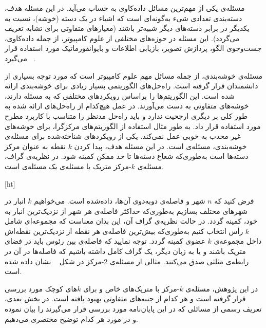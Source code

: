 

مسئله‌ی  یکی از مهم‌ترین مسائل داده‌کاوی به حساب می‌آید.
در این مسئله هدف، دسته‌بندی تعدادی شیء به‌گونه‌ای است که اشیاء در یک دسته (خوشه)، نسبت به یکدیگر در برابر دسته‌های دیگر شبیه‌تر باشند (معیارهای متفاوتی برای تشابه تعریف می‌گردد).
این مسئله در حوزه‌های مختلفی از علوم کامپیوتر، از جمله داده‌کاوی، جست‌وجوی الگو، پردازش تصویر، بازیابی اطلاعات و بایوانفورماتیک مورد استفاده قرار می‌گیرد ~.

مسئله‌ی خوشه‌بندی، از‌ جمله مسائل مهم علوم کامپیوتر است که مورد توجه بسیاری از دانشمندان قرار گرفته است.
راه‌حل‌های الگوریتمی بسیار زیادی برای خوشه‌بندی ارائه شده است.
این الگوریتم‌ها را براساس رویکرد‌های مختلفی که به مسئله دارند، خوشه‌های متفاوتی به دست می‌آورند.
در عمل هیچ‌کدام از راه‌حل‌های ارائه شده به طور کلی بر دیگری ارجحیت ندارد و باید راه‌حل مدنظر را متناسب با کاربرد مطرح مورد استفاده قرار داد.
به طور مثال استفاده از الگوریتم‌های مرکزگرا، برای خوشه‌های غیر محدب به خوبی عمل نمی‌کند.
یکی از رویکردهای شناخته‌شده برای مسئله‌ی خوشه‌بندی، مسئله‌ی  است.
در این مسئله هدف، پیدا کردن $k$ نقطه به عنوان مرکز دسته‌ها است به‌طوری‌که شعاع دسته‌ها تا حد ممکن کمینه شود.
در نظریه‌ی گراف، مسئله‌ی $k$-مرکز متریک یا مسئله‌ی  یک مسئله‌ی  است.

[ht]

فرض کنید که $n$ شهر و فاصله‌ی دوبه‌دوی آن‌ها، داده‌شده است.
می‌خواهیم $k$ انبار در شهرهای مختلف بسازیم به‌طوری‌که حداکثر فاصله‌ی هر شهر از نزدیک‌ترین انبار به خود، کمینه گردد.
در حالت نظریه‌ی گراف آن، این بدان معناست که مجموعه‌ای شامل $k$ رأس انتخاب کنیم به‌طوری‌که بیش‌ترین فاصله‌ی هر نقطه از نزدیک‌ترین نقطه‌اش داخل مجموعه‌ی $k$ عضوی کمینه گردد.
توجه نمایید که فاصله‌ی بین رئوس باید در فضای متریک باشند و یا به زبان دیگر، یک گراف کامل داشته باشیم که فاصله‌ها در آن در رابطه‌ی مثلثی صدق می‌کنند.
مثالی از مسئله‌ی $2$-مرکز در شکل ~ نشان داده شده است.

در این پژوهش، مسئله‌ی $k$-مرکز با متریک‌های خاص و برای $k$های کوچک مورد بررسی قرار گرفته است و هر کدام از‌ جنبه‌های متفاوتی بهبود یافته است.
در بخش بعدی، تعریف رسمی از مسائلی که در این پایان‌نامه مورد بررسی قرار می‌گیرند را بیان نموده و در مورد هر کدام توضیح مختصری می‌دهیم.


